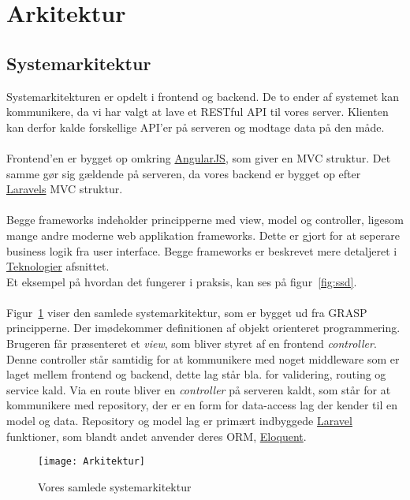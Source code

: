 \section{Arkitektur}
\subsection{Systemarkitektur}
Systemarkitekturen er opdelt i frontend og backend.
De to ender af systemet kan kommunikere, da vi har valgt at lave et RESTful API til vores server.
Klienten kan derfor kalde forskellige API'er på serveren og modtage data på den måde.
\\\\
Frontend'en er bygget op omkring \hyperlink{AngularJS}{AngularJS}, som giver en MVC struktur.
Det samme gør sig gældende på serveren, da vores backend er bygget op efter \hyperlink{Laravel}{Laravels} MVC struktur.
\\\\
Begge frameworks indeholder principperne med view, model og controller, ligesom mange andre moderne web applikation frameworks.
Dette er gjort for at seperare business logik fra user interface. Begge frameworks er beskrevet mere detaljeret i \hyperlink{Teknologier}{Teknologier} afsnittet.
\\
Et eksempel på hvordan det fungerer i praksis, kan ses på figur~\ref{fig:ssd}.
\\\\
Figur~\ref{fig:arkitektur} viser den samlede systemarkitektur, som er bygget ud fra GRASP principperne. Der imødekommer definitionen af objekt orienteret programmering.\\
Brugeren får præsenteret et \textit{view}, som bliver styret af en frontend \textit{controller}. Denne controller står samtidig for at kommunikere med noget middleware som er laget mellem frontend og backend, dette lag står bla. for validering, routing og service kald. Via en route bliver en \textit{controller} på serveren kaldt, som står for at kommunikere med repository, der er en form for data-access lag der kender til en model og data. Repository og model lag er primært indbyggede \hyperlink{Laravel}{Laravel} funktioner, som blandt andet anvender deres ORM, \href{http://laravel.com/docs/5.1/eloquent}{Eloquent}.
\begin{figure}[H]
\texttt{[image: Arkitektur]}
\caption{Vores samlede systemarkitektur}
\label{fig:arkitektur}
\end{figure}
